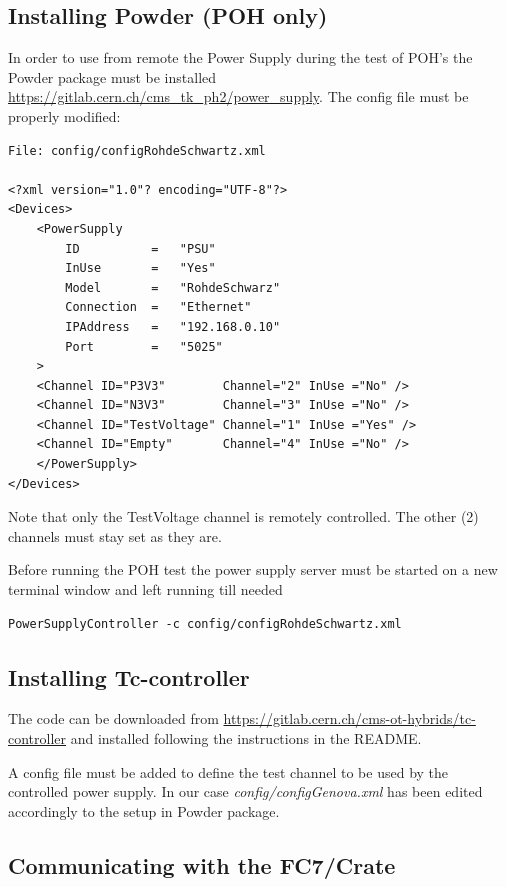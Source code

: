 \documentclass[10pt,a4paper]{article}
\begin{document}
\subsection{Installing Powder (POH only)}
In order to use from remote the Power Supply during the test of POH's the Powder package must be installed \url{https://gitlab.cern.ch/cms_tk_ph2/power_supply}.
The config file must be properly modified:
\begin{framed}
\begin{verbatim}
File: config/configRohdeSchwartz.xml

<?xml version="1.0"? encoding="UTF-8"?>
<Devices>
    <PowerSupply
        ID          =   "PSU"
        InUse       =   "Yes"
        Model       =   "RohdeSchwarz"
        Connection  =   "Ethernet"
        IPAddress   =   "192.168.0.10"
        Port        =   "5025"
    >
    <Channel ID="P3V3"        Channel="2" InUse ="No" />
    <Channel ID="N3V3"        Channel="3" InUse ="No" />
    <Channel ID="TestVoltage" Channel="1" InUse ="Yes" />
    <Channel ID="Empty"       Channel="4" InUse ="No" />
    </PowerSupply>
</Devices>
\end{verbatim}
\end{framed}
Note that only the TestVoltage channel is remotely controlled. The other (2) channels must stay set as they are.

\par Before running the POH test the power supply server must be started on a new terminal window and left running till needed
\begin{framed}
\begin{verbatim}
PowerSupplyController -c config/configRohdeSchwartz.xml
\end{verbatim}
\end{framed}

\subsection{Installing Tc-controller}
The code can be downloaded from \url{https://gitlab.cern.ch/cms-ot-hybrids/tc-controller} and installed following the instructions in the README.
\par A config file must be added to define the test channel to be used by the controlled power supply.
In our case {\it config/configGenova.xml} has been edited accordingly to the setup in Powder package.

\subsection{Communicating with the FC7/Crate}
\end{document}

